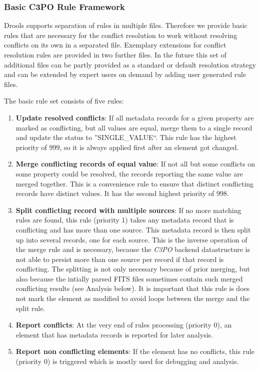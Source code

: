 \documentclass[a4paper,12pt]{article}
\begin{document}
\subsubsection{Basic C3PO Rule Framework}
Drools supports separation of rules in multiple files. Therefore we provide basic rules that are necessary for the conflict resolution to work without resolving conflicts on its own in a separated file. Exemplary extensions for conflict resolution rules are provided in two further files. In the future this set of additional files can be partly provided as a standard or default resolution strategy and can be extended by expert users on demand by adding user generated rule files.

The basic rule set consists of five rules:
\begin{enumerate}
 \item \textbf{Update resolved conflicts}: If all metadata records for a given property are marked as conflicting, but all values are equal, merge them to a single record and update the status to ''SINGLE\_VALUE``. This rule has the highest priority of 999, so it is always applied first after an element got changed.
 \item \textbf{Merge conflicting records of equal value}: If not all but some conflicts on some property could be resolved, the records reporting the same value are merged together. This is a convenience rule to ensure that distinct conflicting records have distinct values. It has the second highest priority of 998.
 \item \textbf{Split conflicting record with multiple sources}: If no more matching rules are found, this rule (priority 1) takes any metadata record that is conflicting and has more than one source. This metadata record is then split up into several records, one for each source. This is the inverse operation of the merge rule and is necessary, because the \emph{C3PO} backend datastructure is not able to persist more than one source per record if that record is conflicting. The splitting is not only necessary because of prior merging, but also because the intially parsed FITS files sometimes contain such merged conflicting results (see Analysis below). It is important that this rule is does not mark the element as modified to avoid loops between the merge and the split rule.
 \item \textbf{Report conflicts}: At the very end of rules processing (priority 0), an element that has metadata records is reported for later analysis.
 \item \textbf{Report non conflicting elements}: If the element has no conflicts, this rule (priority 0) is triggered which is mostly used for debugging and analysis.
\end{enumerate}
\end{document}
